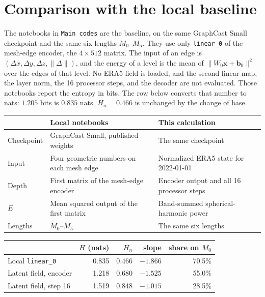 \documentclass[11pt]{article}
\begin{document}
\section{Comparison with the local baseline}

The notebooks in \texttt{Main codes} are the baseline, on the same GraphCast Small checkpoint and the same six lengths \(M_0\)--\(M_5\). They use only \texttt{linear\_0} of the mesh-edge encoder, the \(4 \times 512\) matrix. The input of an edge is \((\Delta x, \Delta y, \Delta z, \|\Delta\|)\), and the energy of a level is the mean of \(\|W_0\mathbf{x}+\mathbf{b}_0\|^2\) over the edges of that level. No ERA5 field is loaded, and the second linear map, the layer norm, the 16 processor steps, and the decoder are not evaluated. Those notebooks report the entropy in bits. The row below converts that number to nats: \(1.205\) bits is \(0.835\) nats. \(H_n = 0.466\) is unchanged by the change of base.

\noindent
\begin{tabularx}{\textwidth}{@{}lXX@{}}
\toprule
& Local notebooks & This calculation \\
\midrule
Checkpoint
  & GraphCast Small, published weights
  & The same checkpoint \\
Input
  & Four geometric numbers on each mesh edge
  & Normalized ERA5 state for 2022-01-01 \\
Depth
  & First matrix of the mesh-edge encoder
  & Encoder output and all 16 processor steps \\
\(E\)
  & Mean squared output of the first matrix
  & Band-summed spherical-harmonic power \\
Lengths
  & \(M_0\)--\(M_5\)
  & The same six lengths \\
\bottomrule
\end{tabularx}

\begin{center}
\begin{tabular}{@{}lrrrr@{}}
\toprule
& \(H\) (nats) & \(H_n\) & slope & share on \(M_0\) \\
\midrule
Local \texttt{linear\_0} & 0.835 & 0.466 & \(-1.866\) & 70.5\% \\
Latent field, encoder & 1.218 & 0.680 & \(-1.525\) & 55.0\% \\
Latent field, step 16 & 1.519 & 0.848 & \(-1.015\) & 28.5\% \\
\bottomrule
\end{tabular}
\end{center}
\end{document}
